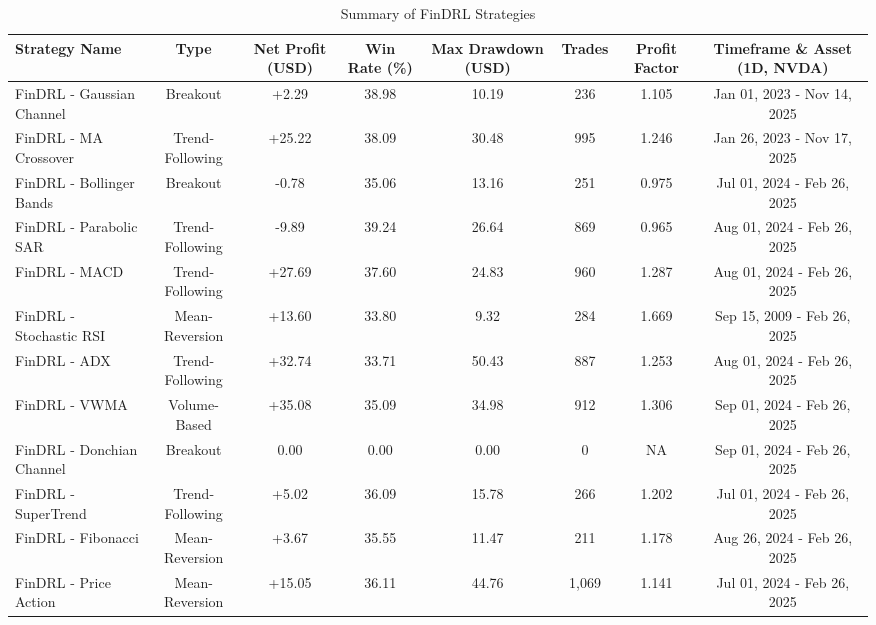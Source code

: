 \begin{table}[h]
\caption{Summary of FinDRL Strategies}
\label{tab:result_strategies}
\tiny
\begin{tabular}{|l|c|c|c|c|c|c|c|}
\toprule
Strategy Name & Type & Net Profit (USD) & Win Rate (\%) & Max Drawdown (USD) & Trades & Profit Factor & Timeframe \& Asset (1D, NVDA)\\
\midrule
FinDRL - Gaussian Channel & Breakout        & +2.29           & 38.98        & 10.19              & 236    & 1.105         & Jan 01, 2023 - Nov 14, 2025 \\
FinDRL - MA Crossover     & Trend-Following & +25.22          & 38.09        & 30.48              & 995    & 1.246         & Jan 26, 2023 - Nov 17, 2025 \\
FinDRL - Bollinger Bands  & Breakout        & -0.78           & 35.06        & 13.16              & 251    & 0.975         & Jul 01, 2024 - Feb 26, 2025\\
FinDRL - Parabolic SAR    & Trend-Following & -9.89           & 39.24        & 26.64              & 869    & 0.965         & Aug 01, 2024 - Feb 26, 2025 \\
FinDRL - MACD             & Trend-Following & +27.69          & 37.60        & 24.83              & 960    & 1.287         & Aug 01, 2024 - Feb 26, 2025\\
FinDRL - Stochastic RSI   & Mean-Reversion  & +13.60          & 33.80        & 9.32               & 284    & 1.669         & Sep 15, 2009 - Feb 26, 2025\\
FinDRL - ADX              & Trend-Following & +32.74          & 33.71        & 50.43              & 887    & 1.253         & Aug 01, 2024 - Feb 26, 2025\\
FinDRL - VWMA             & Volume-Based    & +35.08          & 35.09        & 34.98              & 912    & 1.306         & Sep 01, 2024 - Feb 26, 2025\\
FinDRL - Donchian Channel & Breakout        & 0.00            & 0.00         & 0.00               & 0      & NA            & Sep 01, 2024 - Feb 26, 2025\\
FinDRL - SuperTrend       & Trend-Following & +5.02           & 36.09        & 15.78              & 266    & 1.202         & Jul 01, 2024 - Feb 26, 2025\\
FinDRL - Fibonacci        & Mean-Reversion  & +3.67           & 35.55        & 11.47              & 211    & 1.178         & Aug 26, 2024 - Feb 26, 2025\\
FinDRL - Price Action     & Mean-Reversion  & +15.05          & 36.11        & 44.76              & 1,069  & 1.141         & Jul 01, 2024 - Feb 26, 2025\\

\end{tabular}
\end{table}
